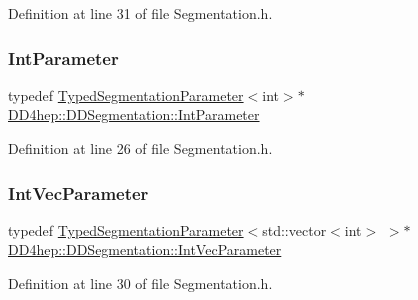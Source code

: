 Definition at line 31 of file Segmentation.\+h.

\hypertarget{namespace_d_d4hep_1_1_d_d_segmentation_a40b9037137fce6e98a4a1b3e74078679}{}\label{namespace_d_d4hep_1_1_d_d_segmentation_a40b9037137fce6e98a4a1b3e74078679} 
\subsubsection{\texorpdfstring{Int\+Parameter}{IntParameter}}
{\footnotesize\ttfamily typedef \hyperlink{class_d_d4hep_1_1_d_d_segmentation_1_1_typed_segmentation_parameter}{Typed\+Segmentation\+Parameter}$<$int$>$$\ast$ \hyperlink{namespace_d_d4hep_1_1_d_d_segmentation_a40b9037137fce6e98a4a1b3e74078679}{D\+D4hep\+::\+D\+D\+Segmentation\+::\+Int\+Parameter}}



Definition at line 26 of file Segmentation.\+h.

\hypertarget{namespace_d_d4hep_1_1_d_d_segmentation_a999961b3c725feedb2456dd0f046f1e3}{}\label{namespace_d_d4hep_1_1_d_d_segmentation_a999961b3c725feedb2456dd0f046f1e3} 
\subsubsection{\texorpdfstring{Int\+Vec\+Parameter}{IntVecParameter}}
{\footnotesize\ttfamily typedef \hyperlink{class_d_d4hep_1_1_d_d_segmentation_1_1_typed_segmentation_parameter}{Typed\+Segmentation\+Parameter}$<$std\+::vector$<$int$>$ $>$$\ast$ \hyperlink{namespace_d_d4hep_1_1_d_d_segmentation_a999961b3c725feedb2456dd0f046f1e3}{D\+D4hep\+::\+D\+D\+Segmentation\+::\+Int\+Vec\+Parameter}}



Definition at line 30 of file Segmentation.\+h.

\hypertarget{namespace_d_d4hep_1_1_d_d_segmentation_af6c6bad2a745d807a0ed00506fb34ccf}{}\label{namespace_d_d4hep_1_1_d_d_segmentation_af6c6bad2a745d807a0ed00506fb34ccf} 
